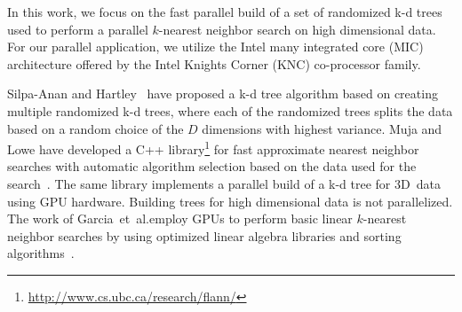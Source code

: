   In this work, we focus on the fast parallel build of a set of randomized 
  k-d trees used to perform a parallel $k$-nearest neighbor search on high 
  dimensional data.  For our parallel application, we utilize the Intel many 
  integrated core (MIC) architecture offered by the Intel Knights Corner (KNC) 
  co-processor family.




   Silpa-Anan and Hartley~\cite{silpa2008a} have proposed 
  a k-d tree algorithm based on creating multiple randomized k-d trees, where 
  each of the randomized trees splits the data based on a random choice of the 
  $D$ dimensions with highest variance.  Muja and Lowe have developed a C++ 
  library\footnote{\url{http://www.cs.ubc.ca/research/flann/}} for fast 
  approximate nearest neighbor searches with automatic algorithm selection 
  based on the data used for the search~\cite{muja2009a,muja2014a}.  The same 
  library implements a parallel build of a k-d tree for $3$D~data using GPU 
  hardware.  Building trees for high dimensional data is not parallelized.  The 
  work of Garcia~et~al.\@ employ GPUs to perform basic linear $k$-nearest 
  neighbor searches by using optimized linear algebra libraries and sorting 
  algorithms~\cite{garcia2008a,garcia2010a}.


